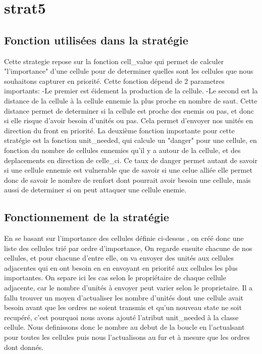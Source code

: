 \documentclass{rapport}
\begin{document}
		\section{strat5}
			\subsection{Fonction utilisées dans la stratégie}
Cette strategie repose sur la fonction cell\_value qui permet de calculer "l'importance" d'une cellule
pour de determiner quelles sont les cellules que nous souhaitons capturer en priorité.
Cette fonction dépend de 2 parametres importants:
		-Le premier est éidement la production de la cellule.
		-Le second est la distance de la cellule à la cellule ennemie la plus proche en nombre de saut. Cette distance
permet de determiner si la cellule est proche des enemis ou pas, et donc si elle risque d'avoir besoin d'unités ou pas.
Cela permet d'envoyer nos unités en direction du front en priorité.
La deuxième fonction importante pour cette stratégie est la fonction unit\_needed, qui calcule un "danger" pour une cellule,
en fonction du nombre de cellules ennemies qu'il y a autour de la cellule, et des deplacements en direction de celle\_ci.
Ce taux de danger permet autant de savoir si une cellule ennemie est vulnerable que de savoir si une celue alliée elle permet donc
de savoir le nombre de renfort dont pourrait avoir besoin une cellule, mais aussi de determiner si on peut attaquer une cellule enemie.
			\subsection{Fonctionnement de la stratégie}
En se basant sur l'importance des cellules définie ci-dessus , on créé donc une liste des cellules trié par ordre d'importance,
On regarde ensuite chacune de nos cellules, et pour chacune d'entre elle, on va envoyer des unités aux cellules adjacentes qui en ont besoin
en en envoyant en priorité aux cellules les plus importantes.
On separe ici les cas selon le propriétaire de chaque cellule adjacente, car le nombre d'unités à envoyer peut varier selon le proprietaire.
Il a fallu trouver un moyen d'actualiser les nombre d'unités dont une cellule avait besoin avant que les ordres ne soient transmis et qu'un nouveau
state ne soit recupéré, c'est pourquoi nous avons ajouté l'atribut unit\_needed à la classe cellule. Nous definissons donc le nombre au debut de la boucle
en l'actualsant pour toutes les cellules puis nous l'actualisons au fur et à mesure que les ordres dont donnés.
		\section{}
\end{document}
